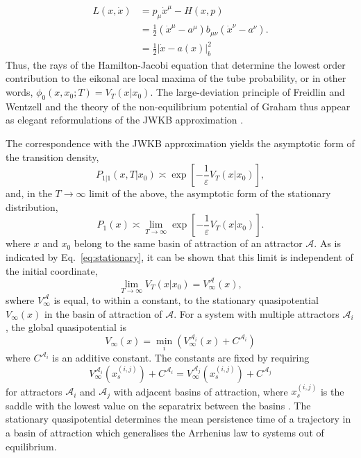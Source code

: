 \begin{align}
L(x,\dot{x}) & =p_{\mu}\dot{x}^{\mu}-H(x,p)\label{eq:Legendre-form-of-Lagrangian}\\
 & =\frac{1}{2}(\dot{x}^{\mu}-a^{\mu})b_{\mu\nu}(\dot{x}^{\nu}-a^{\nu}).\nonumber \\
 & =\frac{1}{2}|\dot{x}-a(x)|_{b}^{2}\nonumber 
\end{align}
Thus, the rays of the Hamilton-Jacobi equation that determine the
lowest order contribution to the eikonal are local maxima of the tube
probability, or in other words, $\phi_{0}(x,x_{0};T)=V_{T}(x|x_{0})$.
The large-deviation principle of Freidlin and Wentzell and the theory
of the non-equilibrium potential of Graham \citep{graham1973statistical,graham1987macroscopic}
thus appear as elegant reformulations of the JWKB approximation \citep{ludwig1975persistence}. 

The correspondence with the JWKB approximation yields the asymptotic
form of the transition density,
\begin{equation}
P_{1|1}(x,T|x_{0})\asymp\exp\left[-\frac{1}{\varepsilon}V_{T}(x|x_{0})\right],
\end{equation}
and, in the $T\rightarrow\infty$ limit of the above, the asymptotic
form of the stationary distribution,
\begin{equation}
P_{1}(x)\asymp\lim_{T\to\infty}\exp\left[-\frac{1}{\varepsilon}V_{T}(x|x_{0})\right].\label{eq:stationary}
\end{equation}
where $x$ and $x_{0}$ belong to the same basin of attraction of
an attractor $\mathcal{A}$. As is indicated by Eq.~\ref{eq:stationary},
it can be shown that this limit is independent of
the initial coordinate,
\begin{equation}
\lim_{T\to\infty}V_{T}(x|x_{0})=V_{\infty}^{\mathcal{A}}(x),
\end{equation}
swhere $V_{\infty}^{\mathcal{A}}$ is equal, to within a constant,
to the stationary quasipotential $V_{\infty}(x)$ in the basin of
attraction of $\mathcal{A}$. For a system with multiple attractors
$\mathcal{A}_{i}$, the global quasipotential is
\begin{equation}
V_{\infty}(x)=\min_{i}\left(V_{\infty}^{\mathcal{A}_{i}}(x)+C^{\mathcal{A}_{i}}\right)\label{eq:aggregated quasi-potential}
\end{equation}
where $C^{\mathcal{A}_{i}}$ is an additive constant. The constants
are fixed by requiring
\begin{equation}
V_{\infty}^{\mathcal{A}_{i}}(x_{s}^{(i,j)})+C^{\mathcal{A}_{i}}=V_{\infty}^{\mathcal{A}_{j}}(x_{s}^{(i,j)})+C^{\mathcal{A}_{j}}
\end{equation}
for attractors $\mathcal{A}_{i}$ and $\mathcal{A}_{j}$ with adjacent
basins of attraction, where $x_{s}^{(i,j)}$ is the saddle with the
lowest value on the separatrix between the basins \citep{graham1987macroscopic}.
The stationary quasipotential determines the mean persistence time
of a trajectory in a basin of attraction which generalises the Arrhenius
law to systems out of equilibrium. 

